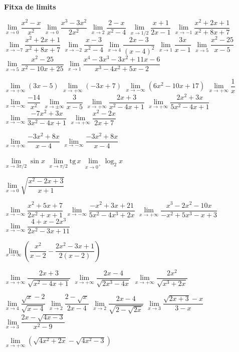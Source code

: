 \documentclass[11pt, a4paper]{book}
\begin{document}
\textbf{Fitxa de limits}
\begin{enumerate}
  \task $\mathop{lim}\limits_{x\to 0 } \dfrac{x^2-x}{x^2}$
  \task $\mathop{lim}\limits_{x\to 0 } \dfrac{x^3-3x^2}{2x^2}$
  \task $\mathop{lim}\limits_{x\to 2 } \dfrac{2-x}{x^2-4}$
  \task $\mathop{lim}\limits_{x\to 1/2 } \dfrac{x+1}{2x-1}$
  \task $\mathop{lim}\limits_{x\to -1 } \dfrac{x^2+2x+1}{x^2+8x+7}$
  \task $\mathop{lim}\limits_{x\to -7} \dfrac{x^2+2x+1}{x^2+8x+7}$
  \task $\mathop{lim}\limits_{x\to -2 } \dfrac{x-3}{x^2-4}$
  \task $\mathop{lim}\limits_{x\to 4 } \dfrac{2x-3}{(x-4)^2}$
  \task $\mathop{lim}\limits_{x\to 1 } \dfrac{3x}{x-1}$
  \task $\mathop{lim}\limits_{x\to 5 } \dfrac{x^2-25}{x-5}$
\task $\mathop{lim}\limits_{x\to 5 } \dfrac{x^2-25}{x^2-10x+25}$
\task $\mathop{lim}\limits_{x\to 1 } \dfrac{x^4-3x^3-3x^2+11x-6}{x^3-4x^2+5x-2}$

\task $\mathop{lim}\limits_{x\to +\infty } (3x-5)$
\task $\mathop{lim}\limits_{x\to +\infty } (-3x+7)$
\task $\mathop{lim}\limits_{x\to -\infty } (6x^2-10x+17)$
\task $\mathop{lim}\limits_{x\to +\infty } \dfrac{1}{x}$
\task $\mathop{lim}\limits_{x\to -\infty } \dfrac{-14}{x^2}$
\task $\mathop{lim}\limits_{x\to \pm\infty } \dfrac{3}{x-5}$
\task $\mathop{lim}\limits_{x\to +\infty } \dfrac{2x+3}{x^2-4x+1}$
\task $\mathop{lim}\limits_{x\to +\infty } \dfrac{2x^2+3x}{5x^2-4x+1}$
\task $\mathop{lim}\limits_{x\to -\infty } \dfrac{-7x^2+3x}{3x^2-4x+1}$
\task $\mathop{lim}\limits_{x\to +\infty } \dfrac{x^2-2x}{2x+7}$

\task $\mathop{lim}\limits_{x\to +\infty } \dfrac{-3x^2+8x}{x-4}$
\task $\mathop{lim}\limits_{x\to -\infty } \dfrac{-3x^2+8x}{x-4}$

\task $\mathop{lim}\limits_{x\to 3\pi /2 } \sin x$
\task $\mathop{lim}\limits_{x\to \pi /2 } \mathrm{tg}\, x$
\task $\mathop{lim}\limits_{x\to 0^+} \log_2 x$

\task $\mathop{lim}\limits_{x\to 0 } \sqrt{\dfrac{x^2-2x+3}{x+1}}$

\task $\mathop{lim}\limits_{x\to -\infty } \dfrac{x^2+5x+7}{2x^2+x+1}$
\task $\mathop{lim}\limits_{x\to -\infty } \dfrac{-x^2+3x+21}{5x^2-4x^3+2x}$
\task $\mathop{lim}\limits_{x\to +\infty } \dfrac{x^3-2x^2-10x}{-x^2+5x^3-x+3}$
\task $\mathop{lim}\limits_{x\to -\infty } \dfrac{4+x-2x^3}{2x^2-3x+11}$

\task $\mathop{lim}\limits_{x\to \infty } \left( \dfrac{x^2}{x-2} - \dfrac{2x^2-3x+1}{2(x-2)} \right)$

\task $\mathop{lim}\limits_{x\to +\infty } \dfrac{2x+3}{\sqrt{x^2-4x+1}}$
\task $\mathop{lim}\limits_{x\to +\infty } \dfrac{2x-4}{\sqrt{2x^3-4x}}$
\task $\mathop{lim}\limits_{x\to +\infty } \dfrac{2x^2}{\sqrt{x^3+2x}}$

\task $\mathop{lim}\limits_{x\to 4 } \dfrac{\sqrt{x}-2}{\sqrt{x-4}}$
\task $\mathop{lim}\limits_{x\to 2 } \dfrac{2-\sqrt{x}}{2x-4}$
\task $\mathop{lim}\limits_{x\to 2 } \dfrac{2x-4}{\sqrt{2-\sqrt{2x}}}$
\task $\mathop{lim}\limits_{x\to 3 } \dfrac{\sqrt{2x+3}-x}{3-x}$
\task $\mathop{lim}\limits_{x\to 3 } \dfrac{2x-\sqrt{4x-3}}{x^2-9}$

\task $\mathop{lim}\limits_{x\to +\infty } \left( \sqrt{4x^2+2x} - \sqrt{4x^2-3} \right)$
\end{enumerate}
\end{document}
